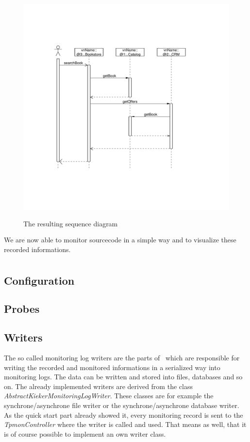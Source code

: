\documentclass[a4paper, oneside, 11pt]{scrartcl}
\begin{document}
\begin{figure}[H]
	\begin{center}
		\includegraphics[width=1.0\textwidth]{sequenceDiagram.pdf}
		\label{image:sequencediagram}
		\caption{The resulting sequence diagram}
	\end{center}
\end{figure}
We are now able to monitor sourcecode in a simple way and to visualize these recorded informations.

\section{\KiekerMonitoring}
\subsection{Configuration}
\subsection{Probes}
\subsection{Writers}
The so called monitoring log writers are the parts of \Kieker\ which are responsible for writing the recorded and monitored informations in a serialized way into monitoring logs. The data can be written and stored into files, databases and so on. The already implemented writers are derived from the class \textit{AbstractKiekerMonitoringLogWriter}. These classes are for example the synchrone/asynchrone file writer or the synchrone/asynchrone database writer. As the quick start part already showed it, every monitoring record is sent to the \textit{TpmonController} where the writer is called and used. That means as well, that it is of course possible to implement an own writer class.
\end{document}
